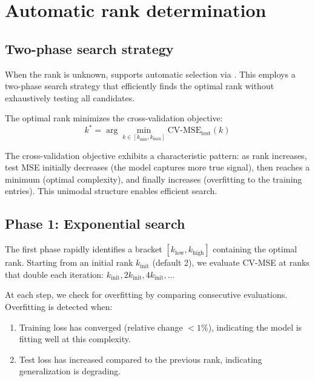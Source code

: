 \documentclass[article]{jss_modified}
\begin{document}
\section{Automatic rank determination} \label{sec:automatic}

\subsection{Two-phase search strategy}

When the rank is unknown,  supports automatic selection via 
. This employs a two-phase search strategy that efficiently 
finds the optimal rank without exhaustively testing all candidates.

The optimal rank minimizes the cross-validation objective:
\begin{equation}
  k^* = \arg\min_{k \in [k_{\min}, k_{\max}]} \text{CV-MSE}_{\text{test}}(k)
  \label{eq:auto_k}
\end{equation}

The cross-validation objective exhibits a characteristic pattern: as rank 
increases, test MSE initially decreases (the model captures more true signal), 
then reaches a minimum (optimal complexity), and finally increases (overfitting 
to the training entries). This unimodal structure enables efficient search.

\subsection{Phase 1: Exponential search}

The first phase rapidly identifies a bracket $[k_{\text{low}}, k_{\text{high}}]$ 
containing the optimal rank. Starting from an initial rank $k_{\text{init}}$ 
(default 2), we evaluate CV-MSE at ranks that double each iteration: 
$k_{\text{init}}, 2k_{\text{init}}, 4k_{\text{init}}, \ldots$

At each step, we check for overfitting by comparing consecutive evaluations. 
Overfitting is detected when:
\begin{enumerate}
  \item Training loss has converged (relative change $< 1\%$), indicating the 
  model is fitting well at this complexity.
  \item Test loss has increased compared to the previous rank, indicating 
  generalization is degrading.
\end{enumerate}
\end{document}
